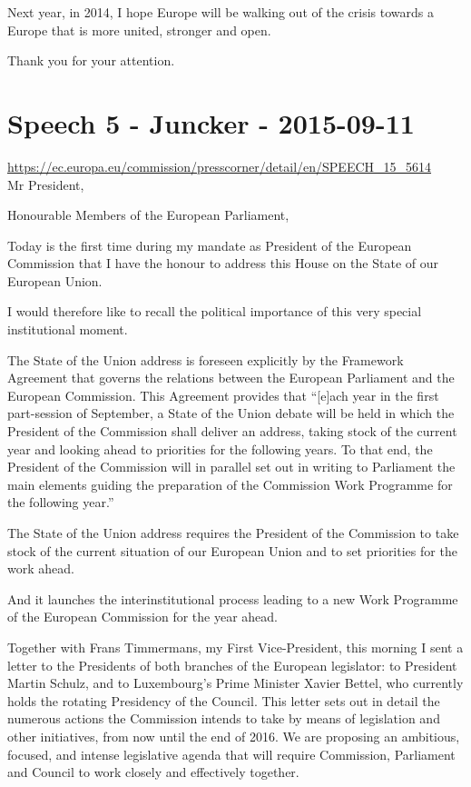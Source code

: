 \documentclass[a4paper,11pt]{article}
\begin{document}
Next year, in 2014, I hope Europe will be walking out of the crisis towards a Europe that is more united, stronger and open.

Thank you for your attention.
 \newpage\section{Speech 5 - Juncker - 2015-09-11}
\url{https://ec.europa.eu/commission/presscorner/detail/en/SPEECH_15_5614}\\[3mm]
Mr President,

Honourable Members of the European Parliament,

Today is the first time during my mandate as President of the European Commission that I have the honour to address this House on the State of our European Union.

I would therefore like to recall the political importance of this very special institutional moment.

The State of the Union address is foreseen explicitly by the Framework Agreement that governs the relations between the European Parliament and the European Commission. This Agreement provides that “[e]ach year in the first part-session of September, a State of the Union debate will be held in which the President of the Commission shall deliver an address, taking stock of the current year and looking ahead to priorities for the following years. To that end, the President of the Commission will in parallel set out in writing to Parliament the main elements guiding the preparation of the Commission Work Programme for the following year.”

The State of the Union address requires the President of the Commission to take stock of the current situation of our European Union and to set priorities for the work ahead.

And it launches the interinstitutional process leading to a new Work Programme of the European Commission for the year ahead.

Together with Frans Timmermans, my First Vice-President, this morning I sent a letter to the Presidents of both branches of the European legislator: to President Martin Schulz, and to Luxembourg’s Prime Minister Xavier Bettel, who currently holds the rotating Presidency of the Council. This letter sets out in detail the numerous actions the Commission intends to take by means of legislation and other initiatives, from now until the end of 2016. We are proposing an ambitious, focused, and intense legislative agenda that will require Commission, Parliament and Council to work closely and effectively together.
\end{document}

